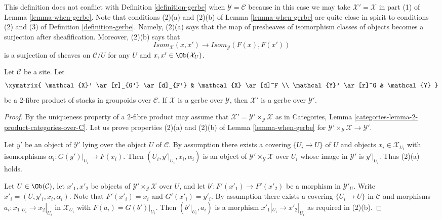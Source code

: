 \noindent
This definition does not conflict with
Definition \ref{definition-gerbe}
when $\mathcal{Y} = \mathcal{C}$ because in this case we may take
$\mathcal{X}' = \mathcal{X}$ in part (1) of
Lemma \ref{lemma-when-gerbe}.
Note that conditions (2)(a) and (2)(b) of
Lemma \ref{lemma-when-gerbe}
are quite close in spirit to conditions (2) and (3) of
Definition \ref{definition-gerbe}.
Namely, (2)(a) says that the map of presheaves of isomorphism
classes of objects becomes a surjection after sheafification.
Moreover, (2)(b) says that
$$
\mathit{Isom}_\mathcal{X}(x, x')
\longrightarrow
\mathit{Isom}_\mathcal{Y}(F(x), F(x'))
$$
is a surjection of sheaves on $\mathcal{C}/U$ for any $U$ and
$x, x' \in \Ob(\mathcal{X}_U)$.

\begin{lemma}
\label{lemma-base-change-gerbe}
Let $\mathcal{C}$ be a site. Let
$$
\xymatrix{
\mathcal{X}' \ar[r]_{G'} \ar[d]_{F'} & \mathcal{X} \ar[d]^F \\
\mathcal{Y}' \ar[r]^G & \mathcal{Y}
}
$$
be a $2$-fibre product of stacks in groupoids over $\mathcal{C}$.
If $\mathcal{X}$ is a gerbe over $\mathcal{Y}$, then
$\mathcal{X}'$ is a gerbe over $\mathcal{Y}'$.
\end{lemma}

\begin{proof}
By the uniqueness property of a $2$-fibre product may assume that
$\mathcal{X}' = \mathcal{Y}' \times_\mathcal{Y} \mathcal{X}$
as in
Categories, Lemma \ref{categories-lemma-2-product-categories-over-C}.
Let us prove properties (2)(a) and (2)(b) of
Lemma \ref{lemma-when-gerbe}
for $\mathcal{Y}' \times_\mathcal{Y} \mathcal{X} \to \mathcal{Y}'$.

\medskip\noindent
Let $y'$ be an object of $\mathcal{Y}'$ lying over the object $U$
of $\mathcal{C}$. By assumption there exists
a covering $\{U_i \to U\}$ of $U$ and objects
$x_i \in \mathcal{X}_{U_i}$ with isomorphisms
$\alpha_i : G(y')|_{U_i} \to F(x_i)$.
Then $(U_i, y'|_{U_i}, x_i, \alpha_i)$ is an object of
$\mathcal{Y}' \times_\mathcal{Y} \mathcal{X}$ over $U_i$
whose image in $\mathcal{Y}'$ is $y'|_{U_i}$. Thus (2)(a) holds.

\medskip\noindent
Let $U \in \Ob(\mathcal{C})$, let $x'_1, x'_2$ be objects of
$\mathcal{Y}' \times_\mathcal{Y} \mathcal{X}$ over $U$, and let
$b' : F'(x'_1) \to F'(x'_2)$ be a morphism in $\mathcal{Y}'_U$.
Write $x'_i = (U, y'_i, x_i, \alpha_i)$. Note that $F'(x'_i) = x_i$
and $G'(x'_i) = y'_i$. By assumption there exists
a covering $\{U_i \to U\}$ in $\mathcal{C}$ and morphisms
$a_i : x_1|_{U_i} \to x_2|_{U_i}$ in $\mathcal{X}_{U_i}$ with
$F(a_i) = G(b')|_{U_i}$. Then $(b'|_{U_i}, a_i)$ is a morphism
$x'_1|_{U_i} \to x'_2|_{U_i}$ as required in (2)(b).
\end{proof}

